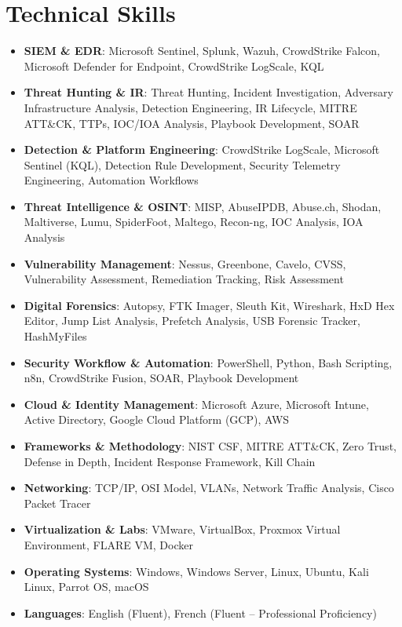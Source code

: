 \documentclass[A4]{article}
\begin{document}
\section{Technical Skills}
\begin{itemize}[leftmargin=0.5cm, label={}]
    \item \textbf{SIEM \& EDR}: Microsoft Sentinel, Splunk, Wazuh, CrowdStrike Falcon, Microsoft Defender for Endpoint, CrowdStrike LogScale, KQL
    \item \textbf{Threat Hunting \& IR}: Threat Hunting, Incident Investigation, Adversary Infrastructure Analysis, Detection Engineering, IR Lifecycle, MITRE ATT\&CK, TTPs, IOC/IOA Analysis, Playbook Development, SOAR
    \item \textbf{Detection \& Platform Engineering}: CrowdStrike LogScale, Microsoft Sentinel (KQL), Detection Rule Development, Security Telemetry Engineering, Automation Workflows
    \item \textbf{Threat Intelligence \& OSINT}: MISP, AbuseIPDB, Abuse.ch, Shodan, Maltiverse, Lumu, SpiderFoot, Maltego, Recon-ng, IOC Analysis, IOA Analysis
    \item \textbf{Vulnerability Management}: Nessus, Greenbone, Cavelo, CVSS, Vulnerability Assessment, Remediation Tracking, Risk Assessment
    \item \textbf{Digital Forensics}: Autopsy, FTK Imager, Sleuth Kit, Wireshark, HxD Hex Editor, Jump List Analysis, Prefetch Analysis, USB Forensic Tracker, HashMyFiles
    \item \textbf{Security Workflow \& Automation}: PowerShell, Python, Bash Scripting, n8n, CrowdStrike Fusion, SOAR, Playbook Development
    \item \textbf{Cloud \& Identity Management}: Microsoft Azure, Microsoft Intune, Active Directory, Google Cloud Platform (GCP), AWS
    \item \textbf{Frameworks \& Methodology}: NIST CSF, MITRE ATT\&CK, Zero Trust, Defense in Depth, Incident Response Framework, Kill Chain
    \item \textbf{Networking}: TCP/IP, OSI Model, VLANs, Network Traffic Analysis, Cisco Packet Tracer
    \item \textbf{Virtualization \& Labs}: VMware, VirtualBox, Proxmox Virtual Environment, FLARE VM, Docker
    \item \textbf{Operating Systems}: Windows, Windows Server, Linux, Ubuntu, Kali Linux, Parrot OS, macOS
    \item \textbf{Languages}: English (Fluent), French (Fluent -- Professional Proficiency)
\end{itemize}
\end{document}
